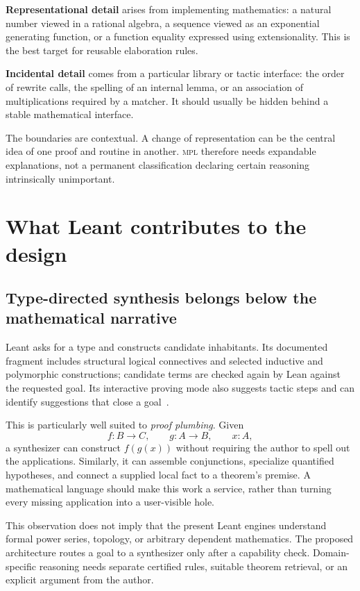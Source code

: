 \documentclass[11pt,a4paper]{article}
\newcommand{\MPL}{\textnormal{\textsc{mpl}}}
\theoremstyle{remark}
\begin{document}
\textbf{Representational detail} arises from implementing mathematics: a natural number viewed in a rational algebra, a sequence viewed as an exponential generating function, or a function equality expressed using extensionality. This is the best target for reusable elaboration rules.

\textbf{Incidental detail} comes from a particular library or tactic interface: the order of rewrite calls, the spelling of an internal lemma, or an association of multiplications required by a matcher. It should usually be hidden behind a stable mathematical interface.

The boundaries are contextual. A change of representation can be the central idea of one proof and routine in another. \MPL{} therefore needs expandable explanations, not a permanent classification declaring certain reasoning intrinsically unimportant.

\section{What Leant contributes to the design}
\label{sec:leant}

\subsection{Type-directed synthesis belongs below the mathematical narrative}

Leant asks for a type and constructs candidate inhabitants. Its documented fragment includes structural logical connectives and selected inductive and polymorphic constructions; candidate terms are checked again by Lean against the requested goal. Its interactive proving mode also suggests tactic steps and can identify suggestions that close a goal~\cite{leant-readme}.

This is particularly well suited to \emph{proof plumbing}. Given
\[
f:B\to C,\qquad g:A\to B,\qquad x:A,
\]
a synthesizer can construct $f(g(x))$ without requiring the author to spell out the applications. Similarly, it can assemble conjunctions, specialize quantified hypotheses, and connect a supplied local fact to a theorem's premise. A mathematical language should make this work a service, rather than turning every missing application into a user-visible hole.

This observation does not imply that the present Leant engines understand formal power series, topology, or arbitrary dependent mathematics. The proposed architecture routes a goal to a synthesizer only after a capability check. Domain-specific reasoning needs separate certified rules, suitable theorem retrieval, or an explicit argument from the author.
\end{document}
